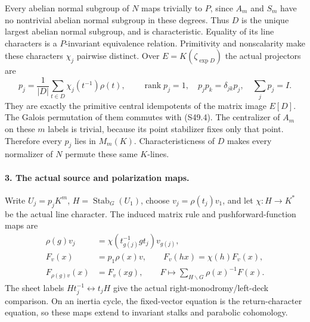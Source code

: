 Every abelian normal subgroup of \(N\) maps trivially to
\(P\), since \(A_m\) and \(S_m\) have no nontrivial
abelian normal subgroup in these degrees. Thus \(D\) is
the unique largest abelian normal subgroup, and is
characteristic. Equality of its line characters is a
\(P\)-invariant equivalence relation. Primitivity and
nonscalarity make these characters \(\chi_j\) pairwise
distinct. Over \(E=K(\zeta_{\exp D})\) the actual
projectors are
\[
 p_j=\frac1{|D|}\sum_{t\in D}\chi_j(t^{-1})\rho(t),
 \qquad \operatorname{rank}p_j=1,\quad
 p_jp_k=\delta_{jk}p_j,\quad\sum_jp_j=I.                \tag{S49.6}
\]
They are exactly the primitive central idempotents of the
matrix image \(E[D]\). The Galois permutation of them
commutes with (S49.4). The centralizer of \(A_m\) on
these \(m\) labels is trivial, because its point stabilizer
fixes only that point. Therefore every \(p_j\) lies in
\(M_m(K)\). Characteristicness of \(D\) makes every
normalizer of \(N\) permute these same \(K\)-lines.

\paragraph{3. The actual source and polarization maps.}
Write \(U_j=p_jK^m\), \(H=\operatorname{Stab}_G(U_1)\),
choose \(v_j=\rho(t_j)v_1\), and let
\(\chi:H\to K^*\) be the actual line character. The
induced matrix rule and pushforward-function maps are
\[
\begin{aligned}
 \rho(g)v_j&=\chi(t_{g(j)}^{-1}gt_j)v_{g(j)},\\
 F_v(x)&=p_1\rho(x)v,\qquad F_v(hx)=\chi(h)F_v(x),\\
 F_{\rho(g)v}(x)&=F_v(xg),\qquad
 F\longmapsto\sum_{H\backslash G}\rho(x)^{-1}F(x).
\end{aligned}                                                   \tag{S49.7}
\]
The sheet labels \(Ht_j^{-1}\leftrightarrow t_jH\)
give the actual right-monodromy/left-deck comparison. On an
inertia cycle, the fixed-vector equation is the return-character
equation, so these maps extend to invariant stalks and
parabolic cohomology.

